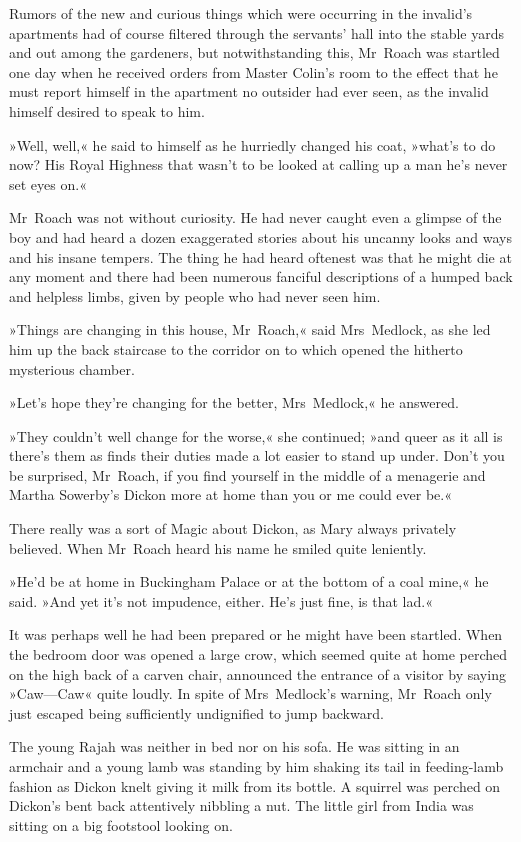 Rumors of the new and curious things which were occurring in the invalid's apartments had of course filtered through the servants' hall into the stable yards and out among the gardeners, but notwithstanding this, Mr~Roach was startled one day when he received orders from Master Colin's room to the effect that he must report himself in the apartment no outsider had ever seen, as the invalid himself desired to speak to him.

»Well, well,« he said to himself as he hurriedly changed his coat, »what's to do now? His Royal Highness that wasn't to be looked at calling up a man he's never set eyes on.«

Mr~Roach was not without curiosity. He had never caught even a glimpse of the boy and had heard a dozen exaggerated stories about his uncanny looks and ways and his insane tempers. The thing he had heard oftenest was that he might die at any moment and there had been numerous fanciful descriptions of a humped back and helpless limbs, given by people who had never seen him.

»Things are changing in this house, Mr~Roach,« said Mrs~Medlock, as she led him up the back staircase to the corridor on to which opened the hitherto mysterious chamber.

»Let's hope they're changing for the better, Mrs~Medlock,« he answered.

»They couldn't well change for the worse,« she continued; »and queer as it all is there's them as finds their duties made a lot easier to stand up under. Don't you be surprised, Mr~Roach, if you find yourself in the middle of a menagerie and Martha Sowerby's Dickon more at home than you or me could ever be.«

There really was a sort of Magic about Dickon, as Mary always privately believed. When Mr~Roach heard his name he smiled quite leniently.

»He'd be at home in Buckingham Palace or at the bottom of a coal mine,« he said. »And yet it's not impudence, either. He's just fine, is that lad.«

It was perhaps well he had been prepared or he might have been startled. When the bedroom door was opened a large crow, which seemed quite at home perched on the high back of a carven chair, announced the entrance of a visitor by saying »Caw—Caw« quite loudly. In spite of Mrs~Medlock's warning, Mr~Roach only just escaped being sufficiently undignified to jump backward.

The young Rajah was neither in bed nor on his sofa. He was sitting in an armchair and a young lamb was standing by him shaking its tail in feeding-lamb fashion as Dickon knelt giving it milk from its bottle. A squirrel was perched on Dickon's bent back attentively nibbling a nut. The little girl from India was sitting on a big footstool looking on.

